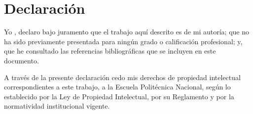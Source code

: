 \chapter*{Declaración}

Yo \theauthor, declaro bajo juramento que el  trabajo aquí descrito es de mi
autoría; que no ha sido previamente presentada para ningún grado o calificación
profesional; y, que he consultado las referencias bibliográficas que se
incluyen en este documento.

A través de la presente declaración cedo mis derechos de propiedad intelectual
correspondientes a este trabajo, a la Escuela Politécnica Nacional, según lo
establecido por la Ley de Propiedad Intelectual, por su Reglamento y por la
normatividad institucional vigente.
\vspace{1.5cm}

\begin{flushright}
\makebox[5cm]{\hrulefill} \\
\theauthor \\
\end{flushright}
